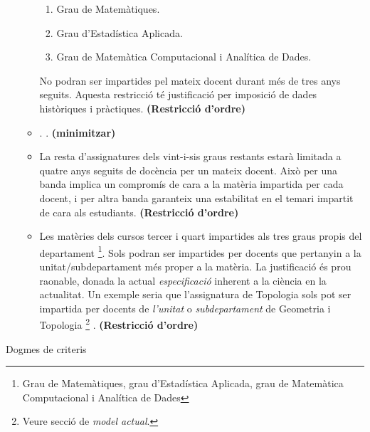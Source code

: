 \documentclass[10pt]{proc}
\begin{document}
\begin{enumerate}
\begin{itemize}
    	\begin{enumerate} 
    		\item Grau de Matemàtiques.
    		\item Grau d'Estadística Aplicada.
    		\item Grau de Matemàtica Computacional i Analítica de Dades.
    	\end{enumerate}
      No podran ser impartides pel mateix docent durant més de tres anys seguits.
      {\color{gray} Aquesta restricció té justificació per imposició de dades històriques i pràctiques.} \textbf{(Restricció d'ordre)} 
    	\item  . {\color{gray} .} \textbf{(minimitzar)} 
    	\item La resta d'assignatures dels vint-i-sis graus restants estarà limitada a quatre anys seguits de docència per un mateix docent. {\color{gray} Això per una banda implica un compromís de cara a la matèria impartida per cada docent, i per altra banda garanteix una estabilitat en el temari impartit de cara als estudiants.} \textbf{(Restricció d'ordre)} 
    	\item  Les matèries  dels cursos tercer i quart impartides als tres graus propis del departament \footnote{Grau de Matemàtiques, grau d'Estadística Aplicada, grau de Matemàtica Computacional i Analítica de Dades}. Sols podran ser impartides per docents que pertanyin a la unitat/subdepartament més proper a la matèria.   {\color{gray} La justificació és prou raonable, donada la actual \textit{especificació} inherent a la ciència en la actualitat. Un exemple seria que l'assignatura de Topologia sols pot ser impartida per docents de \textit{l'unitat} o \textit{subdepartament} de Geometria i Topologia \footnote{Veure secció de  \textit{model actual}.} .} \textbf{(Restricció d'ordre)} 
    \end{itemize}																																					
   
\end{enumerate}
Dogmes de criteris
\footnotesize


\end{document}
